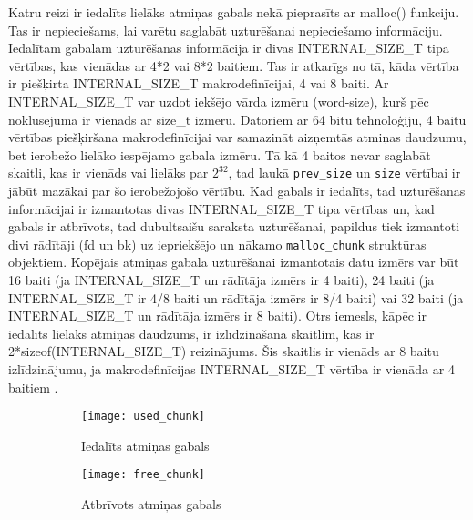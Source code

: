 Katru reizi ir iedalīts lielāks atmiņas gabals nekā pieprasīts ar malloc() funkciju.
Tas ir nepieciešams, lai varētu saglabāt uzturēšanai nepieciešamo informāciju. 
Iedalītam gabalam uzturēšanas informācija ir divas INTERNAL\_SIZE\_T tipa vērtības, kas vienādas ar 4*2 vai 8*2 baitiem. 
Tas ir atkarīgs no tā, kāda vērtība ir piešķirta INTERNAL\_SIZE\_T makrodefinīcijai, 4 vai 8 baiti.
Ar INTERNAL\_SIZE\_T var uzdot iekšējo vārda izmēru (word-size), kurš pēc noklusējuma ir vienāds ar size\_t izmēru.
Datoriem ar 64 bitu tehnoloģiju, 4 baitu vērtības piešķiršana makrodefinīcijai  var samazināt aizņemtās atmiņas daudzumu, bet ierobežo lielāko iespējamo gabala izmēru.
Tā kā 4 baitos nevar saglabāt skaitli, kas ir vienāds vai lielāks par \(2^{32}\), tad laukā \texttt{prev\_size} un \texttt{size} vērtībai ir jābūt mazākai par šo ierobežojošo vērtību.
Kad gabals ir iedalīts, tad uzturēšanas informācijai ir izmantotas divas INTERNAL\_SIZE\_T tipa vērtības un, kad gabals ir atbrīvots, tad  dubultsaišu saraksta uzturēšanai, papildus tiek izmantoti divi rādītāji (fd un bk) uz iepriekšējo un nākamo \texttt{malloc\_chunk} struktūras objektiem. 
Kopējais atmiņas gabala uzturēšanai izmantotais datu izmērs var būt 16 baiti (ja INTERNAL\_SIZE\_T un rādītāja izmērs ir 4 baiti), 24 baiti (ja INTERNAL\_SIZE\_T ir 4/8 baiti un rādītāja izmērs ir 8/4 baiti) vai 32 baiti (ja INTERNAL\_SIZE\_T un rādītāja izmērs ir 8 baiti).  
Otrs iemesls, kāpēc ir iedalīts lielāks atmiņas daudzums, ir izlīdzināšana skaitlim, kas ir  2*sizeof(INTERNAL\_SIZE\_T) reizinājums. Šis skaitlis ir vienāds ar 8 baitu izlīdzinājumu, ja  makrodefinīcijas INTERNAL\_SIZE\_T vērtība  ir vienāda ar 4 baitiem \cite {MALLOC}.  

 \begin{figure}[h]
\begin{center}
\begin{subfigure}[t]{0.5\textwidth}
        \centering
        \texttt{[image: used\_chunk]}
        \caption{Iedalīts atmiņas gabals}
    \end{subfigure}%
\begin{subfigure}[t]{0.5\textwidth}
        \centering
        \texttt{[image: free\_chunk]}
        \caption{Atbrīvots atmiņas gabals}
    \end{subfigure}%
\end{center}
\caption{\textbf{\fontsize{11}{12}\selectfont {Atmiņas gabalu grafiskais struktūras attēlojums}}}
\label{fig:chunks}
\end{figure}


